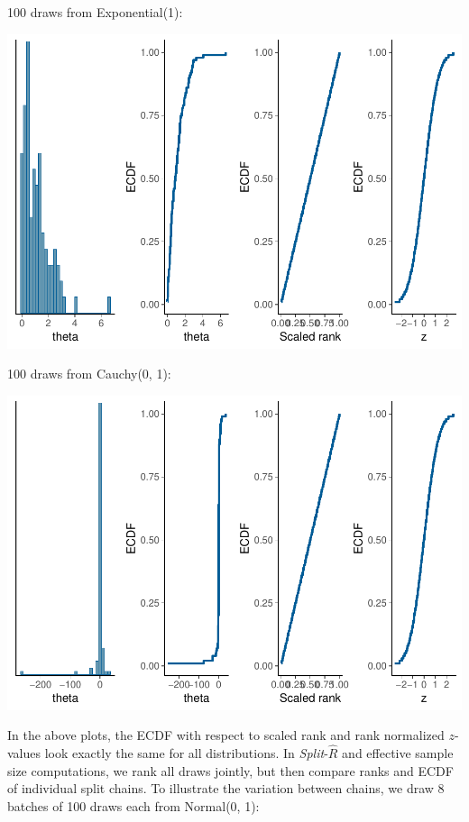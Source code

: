 \documentclass[american,]{article}
\begin{document}
100 draws from Exponential(1):

\includegraphics{graphics/ranknorm-exp-1.pdf}

100 draws from Cauchy(0, 1):

\includegraphics{graphics/ranknorm-cauchy-1.pdf}

In the above plots, the ECDF with respect to scaled rank and rank
normalized \(z\)-values look exactly the same for all distributions. In
\emph{Split}-\(\widehat{R}\) and effective sample size computations, we
rank all draws jointly, but then compare ranks and ECDF of individual
split chains. To illustrate the variation between chains, we draw 8
batches of 100 draws each from Normal(0, 1):
\end{document}
